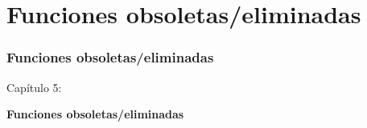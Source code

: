 %

\section{Funciones obsoletas/eliminadas}
\begin{frame}[fragile]
	\frametitle{Funciones obsoletas/eliminadas}

	\begin{center}\huge{Capítulo 5:}\end{center}
	\begin{center}\huge{\color{typo3darkgrey}\textbf{Funciones obsoletas/eliminadas}}\end{center}

\end{frame}


